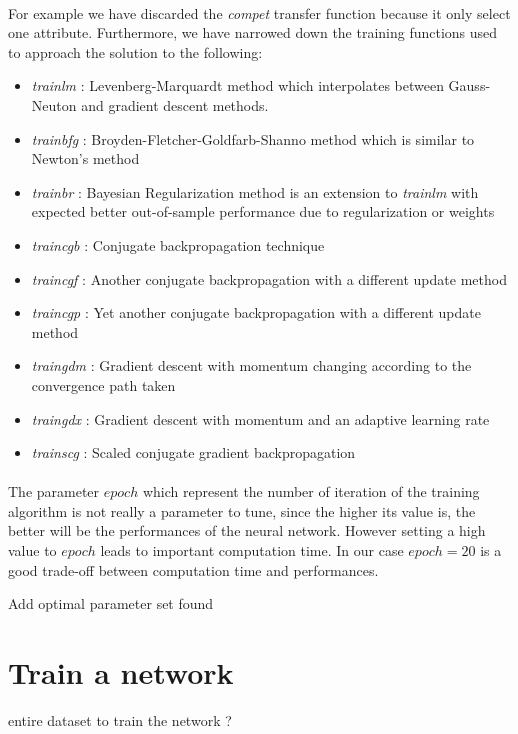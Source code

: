 \documentclass[a4paper,12pt,oneside,final]{report}
\begin{document}
\paragraph{}
For example we have discarded the \textit{compet} transfer function because it only select one attribute. Furthermore, we have narrowed down the training functions used to approach the solution to the following:
\begin{itemize}
\item \textit{trainlm} : Levenberg-Marquardt method which interpolates between Gauss-Neuton and gradient descent methods.
\item \textit{trainbfg} : Broyden-Fletcher-Goldfarb-Shanno method which is similar to Newton's method
\item \textit{trainbr} : Bayesian Regularization method is an extension to \textit{trainlm} with expected better out-of-sample performance due to regularization or weights
\item\textit{traincgb} : Conjugate backpropagation technique
\item \textit{traincgf} : Another conjugate backpropagation with a different update method  
\item \textit{traincgp} : Yet another conjugate backpropagation with a different update method   
\item \textit{traingdm} : Gradient descent with momentum changing according to the convergence path taken
\item \textit{traingdx} : Gradient descent with momentum and an adaptive learning rate
\item \textit{trainscg} : Scaled conjugate gradient backpropagation
\end{itemize}
\paragraph{}
The parameter $epoch$ which represent the number of iteration of the training algorithm is not really a parameter to tune, since the higher its value is, the better will be the performances of the neural network. However setting a high value to $epoch$ leads to important computation time. In our case $epoch=20$ is a good trade-off between computation time and performances.

{\color{red} Add optimal parameter set found}

\section{Train a network}
{\color{red} entire dataset to train the network ?}
\end{document}
